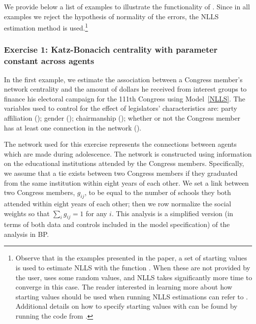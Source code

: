\documentclass[nojss]{jss}
\begin{document}
We provide below a list of examples to illustrate the functionality of
.  Since in all examples we reject the hypothesis of
normality of the errors, the NLLS estimation method is
used.\footnote{Observe that in the examples presented in the paper, a set of
starting values is used to estimate NLLS with the function . 
When these are not provided by the user,  uses some random
values, and NLLS takes significantly more time to converge in this case. 
The reader interested in learning more about how starting values should be
used when running NLLS estimations can refer to \cite{Box:1969}.  Additional
details on how to specify starting values with  can be found
by running the code  from .}

\vspace*{-0.2cm}

\subsubsection{Exercise 1: Katz-Bonacich centrality with parameter constant
across agents}

In the first example, we estimate the association between a Congress
member's network centrality and the amount of dollars he received from
interest groups to finance his electoral campaign for the 111th Congress
using Model~\ref{NLLS}.  The variables used to control for the effect of
legislators' characteristics are: party affiliation (); gender
(); chairmanship (); whether or not the Congress
member has at least one connection in the network ().

The network used for this exercise represents the connections between agents
which are made during adolescence.  The network is constructed using
information on the educational institutions attended by the Congress
members.  Specifically, we assume that a tie exists between two Congress
members if they graduated from the same institution within eight years of
each other.  We set a link between two Congress members, $g_{ij}$, to be
equal to the number of schools they both attended within eight years of each
other; then we row normalize the social weights so that $\sum_{i}g_{ij}=1$
for any $i$.  This analysis is a simplified version (in terms of both data
and controls included in the model specification) of the analysis in BP.

\vspace*{-0.4cm}
\end{document}
